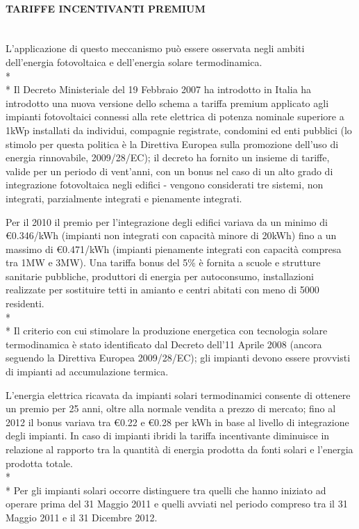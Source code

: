 \documentclass[12pt,a4paper,openright,twoside]{report}
\newcommand{\myparagraph}[1]{\paragraph{#1}\mbox{}\\}
\begin{document}
\myparagraph{TARIFFE INCENTIVANTI PREMIUM}
L'applicazione di questo meccanismo può essere osservata negli ambiti dell'energia fotovoltaica e dell'energia solare termodinamica. \\*\\*
Il Decreto Ministeriale del 19 Febbraio 2007 ha introdotto in Italia ha introdotto una nuova versione dello schema a tariffa premium applicato agli impianti fotovoltaici connessi alla rete elettrica di potenza nominale superiore a 1kWp installati da individui, compagnie registrate, condomini ed enti pubblici (lo stimolo per questa politica è la Direttiva Europea sulla promozione dell'uso  di energia rinnovabile, 2009/28/EC); il decreto ha fornito un insieme di tariffe, valide per un periodo di vent'anni, con un bonus nel caso di un alto grado di integrazione fotovoltaica negli edifici - vengono considerati tre sistemi, non integrati, parzialmente integrati e pienamente integrati.

Per il 2010 il premio per l'integrazione degli edifici variava da un minimo di \euro0.346/kWh (impianti non integrati con capacità minore di 20kWh) fino a un massimo di \euro0.471/kWh (impianti pienamente integrati con capacità compresa tra 1MW e 3MW). Una tariffa bonus del 5\% è fornita a scuole e strutture sanitarie pubbliche, produttori di energia per autoconsumo, installazioni realizzate per sostituire tetti in amianto e centri abitati con meno di 5000 residenti.
\\*\\*
Il criterio con cui stimolare la produzione energetica con tecnologia solare termodinamica è stato identificato dal Decreto dell'11 Aprile 2008 (ancora seguendo la Direttiva Europea 2009/28/EC); gli impianti devono essere provvisti di impianti ad accumulazione termica.

L'energia elettrica ricavata da impianti solari termodinamici consente di ottenere un premio per 25 anni, oltre alla normale vendita a prezzo di mercato; fino al 2012 il bonus variava tra \euro0.22 e \euro0.28 per kWh in base al livello di integrazione degli impianti. In caso di impianti ibridi la tariffa incentivante diminuisce in relazione al rapporto tra la quantità di energia prodotta da fonti solari e l'energia prodotta totale.\\*\\*
Per gli impianti solari occorre distinguere tra quelli che hanno iniziato ad operare prima del 31 Maggio 2011 e quelli avviati nel periodo compreso tra il 31 Maggio 2011 e il 31 Dicembre 2012.
\end{document}
